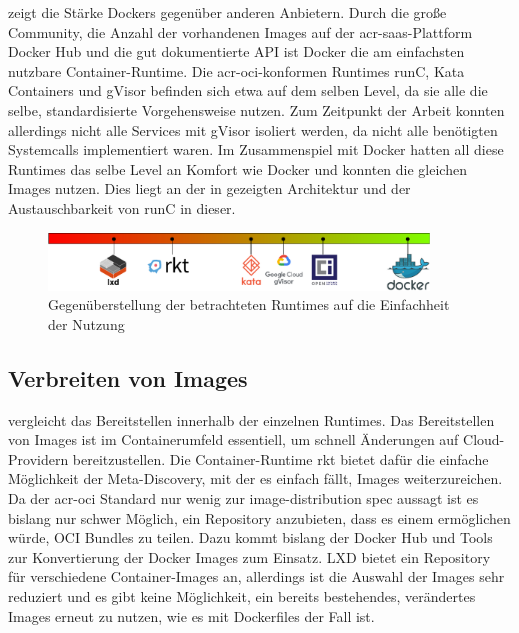 zeigt die Stärke Dockers gegenüber anderen Anbietern. Durch die große Community, die Anzahl der vorhandenen Images auf der \gls{acr-saas}-Plattform Docker Hub und die gut dokumentierte API ist Docker die am einfachsten nutzbare Container-Runtime. Die \gls{acr-oci}-konformen Runtimes runC, Kata Containers und gVisor befinden sich etwa auf dem selben Level, da sie alle die selbe, standardisierte Vorgehensweise nutzen. Zum Zeitpunkt der Arbeit konnten allerdings nicht alle Services mit gVisor isoliert werden, da nicht alle benötigten Systemcalls implementiert waren. Im Zusammenspiel mit Docker hatten all diese Runtimes das selbe Level an Komfort wie Docker und konnten die gleichen Images nutzen. Dies liegt an der in  gezeigten Architektur und der Austauschbarkeit von runC in dieser.

\begin{figure}[h]
	\begin{center}
		\includegraphics[width=0.9\textwidth]{bilder/rating-eou.pdf}
		\caption{Gegenüberstellung der betrachteten Runtimes auf die Einfachheit der Nutzung}
		\label{fig:compFazitEoU}
	\end{center}
\end{figure}

\subsection{Verbreiten von Images}
\label{sec:comFazitShare}

 vergleicht das Bereitstellen innerhalb der einzelnen Runtimes. Das Bereitstellen von Images ist im Containerumfeld essentiell, um schnell Änderungen auf Cloud-Providern bereitzustellen. Die Container-Runtime rkt bietet dafür die einfache Möglichkeit der Meta-Discovery, mit der es einfach fällt, Images weiterzureichen. Da der \gls{acr-oci} Standard nur wenig zur image-distribution spec aussagt ist es bislang nur schwer Möglich, ein Repository anzubieten, dass es einem ermöglichen würde, OCI Bundles zu teilen. Dazu kommt bislang der Docker Hub und Tools zur Konvertierung der Docker Images zum Einsatz. LXD bietet ein Repository für verschiedene Container-Images an, allerdings ist die Auswahl der Images sehr reduziert und es gibt keine Möglichkeit, ein bereits bestehendes, verändertes Images erneut zu nutzen, wie es mit Dockerfiles der Fall ist. 

